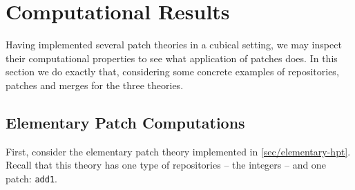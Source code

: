 \section{Computational Results}\label{sec:results}

Having implemented several patch theories in a cubical setting, we may inspect
their computational properties to see what application of patches does.
In this section we do exactly that, considering some concrete examples of repositories,
patches and merges for the three theories.

\subsection{Elementary Patch Computations}\label{subsec:elementary-results}

First, consider the elementary patch theory implemented in \autoref{sec/elementary-hpt}.
Recall that this theory has one type of repositories -- the integers -- and one patch:
\texttt{add1}.

\begin{code}[hide]%
\>[0]\AgdaSymbol{\{-\#}\AgdaSpace{}%
\AgdaSpace{}%
\AgdaSpace{}%
\AgdaSpace{}%
\AgdaSpace{}%
\AgdaSymbol{\#-\}}\<%
\\
\>[0]\AgdaSpace{}%
\AgdaSpace{}%
\<%
\\
\>[0]\AgdaSpace{}%
\AgdaSpace{}%
\<%
\\
\>[0]\AgdaSpace{}%
\AgdaSpace{}%
\<%
\\
\>[0][@{}l@{\AgdaIndent{0}}]%
\>[2]\AgdaSymbol{(}\AgdaSymbol{)}\<%
\\
\>[0]\AgdaSpace{}%
\AgdaModule{\AgdaUnderscore{}}\AgdaSpace{}%
\<%
\\
\>[0][@{}l@{\AgdaIndent{0}}]%
\>[2]\AgdaSpace{}%
\AgdaSpace{}%
\<%
\\
%
\>[2]\AgdaSpace{}%
\AgdaSpace{}%
\<%
\end{code}

